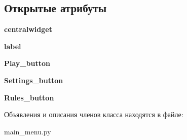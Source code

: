 \subsection*{Открытые атрибуты}
\begin{DoxyCompactItemize}
\item 
\mbox{\label{classmain__menu_1_1_ui___main_window_a7d0551038b28d0f3662a7fecedab39aa}} 
{\bfseries centralwidget}
\item 
\mbox{\label{classmain__menu_1_1_ui___main_window_ad68545e9f2cb04bb0e9b9ffb812551e8}} 
{\bfseries label}
\item 
\mbox{\label{classmain__menu_1_1_ui___main_window_a6ee41d3a7ff065fbebd455a0d72df461}} 
{\bfseries Play\+\_\+button}
\item 
\mbox{\label{classmain__menu_1_1_ui___main_window_ab6a4c2ab6f216b914fd3c43247f168df}} 
{\bfseries Settings\+\_\+button}
\item 
\mbox{\label{classmain__menu_1_1_ui___main_window_a18fe4e29ea44d35885881c30cb60b07a}} 
{\bfseries Rules\+\_\+button}
\end{DoxyCompactItemize}


Объявления и описания членов класса находятся в файле\+:\begin{DoxyCompactItemize}
\item 
main\+\_\+menu.\+py\end{DoxyCompactItemize}
